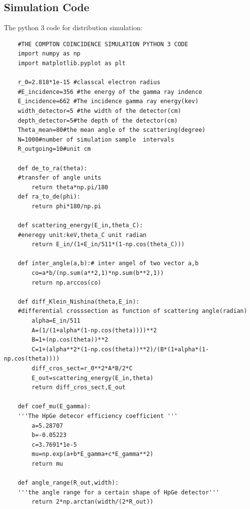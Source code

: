 \documentclass[12pt]{article}
\begin{document}
	\subsection{Simulation Code}
	The python 3 code for distribution simulation:
	\begin{lstlisting}
	#THE COMPTON COINCIDENCE SIMULATION PYTHON 3 CODE
	import numpy as np
	import matplotlib.pyplot as plt
				
	r_0=2.818*1e-15 #classcal electron radius
	#E_incidence=356 #the energy of the gamma ray indence
	E_incidence=662 #The incidence gamma ray energy(kev)
	width_detector=5 #the width of the detector(cm)
	depth_detector=5#the depth of the detector(cm)
	Theta_mean=80#the mean angle of the scattering(degree)
	N=1000#number of simulation sample  intervals
	R_outgoing=10#unit cm
			
	def de_to_ra(theta): 
	#transfer of angle units
		return theta*np.pi/180
	def ra_to_de(phi):
		return phi*180/np.pi
	
	def scattering_energy(E_in,theta_C): 
	#eneregy unit:keV,theta_C unit radian
		return E_in/(1+E_in/511*(1-np.cos(theta_C)))
	
	def inter_angle(a,b):# inter angel of two vector a,b
		co=a*b/(np.sum(a**2,1)*np.sum(b**2,1))
		return np.arccos(co)
	
	def diff_Klein_Nishina(theta,E_in):
	#differential crosssection as function of scattering angle(radian)
		alpha=E_in/511
		A=(1/(1+alpha*(1-np.cos(theta))))**2
		B=1+(np.cos(theta))**2
		C=1+(alpha**2*(1-np.cos(theta))**2)/(B*(1+alpha*(1-np.cos(theta))))
		diff_cros_sect=r_0**2*A*B/2*C
		E_out=scattering_energy(E_in,theta)
		return diff_cros_sect,E_out
	
	def coef_mu(E_gamma):
	'''The HpGe detecor efficiency coefficient '''
		a=5.28707
		b=-0.05223
		c=3.7691*1e-5
		mu=np.exp(a+b*E_gamma+c*E_gamma**2)
		return mu
	
	def angle_range(R_out,width):
	'''the angle range for a certain shape of HpGe detector'''
		return 2*np.arctan(width/(2*R_out))
	

\end{lstlisting}
\end{document}
